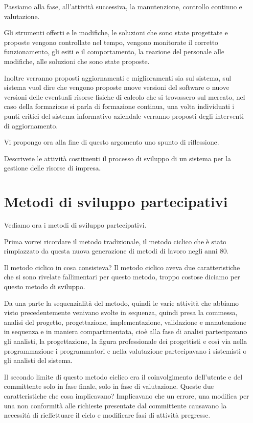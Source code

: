 Passiamo alla fase, all'attività successiva, la manutenzione, controllo continuo e valutazione.

Gli strumenti offerti e le modifiche, le soluzioni che sono state progettate e proposte vengono controllate nel tempo, vengono monitorate il corretto funzionamento, gli esiti e il comportamento, la reazione del personale alle modifiche, alle soluzioni che sono state proposte.

Inoltre verranno proposti aggiornamenti e miglioramenti sia sul sistema, sul sistema vuol dire che vengono proposte nuove versioni del software o nuove versioni delle eventuali risorse fisiche di calcolo che si trovassero sul mercato, nel caso della formazione si parla di formazione continua, una volta individuati i punti critici del sistema informativo aziendale verranno proposti degli interventi di aggiornamento.

Vi propongo ora alla fine di questo argomento uno spunto di riflessione.

Descrivete le attività costituenti il processo di sviluppo di un sistema per la gestione delle risorse di impresa.

\section{Metodi di sviluppo partecipativi}



Vediamo ora i metodi di sviluppo partecipativi.

Prima vorrei ricordare il metodo tradizionale, il metodo ciclico che è stato rimpiazzato da questa nuova generazione di metodi di lavoro negli anni 80.

Il metodo ciclico in cosa consisteva?
Il metodo ciclico aveva due caratteristiche che si sono rivelate fallimentari per questo metodo, troppo costose diciamo per questo metodo di sviluppo.

Da una parte la sequenzialità del metodo, quindi le varie attività che abbiamo visto precedentemente venivano svolte in sequenza, quindi presa la commessa, analisi del progetto, progettazione, implementazione, validazione e manutenzione in sequenza e in maniera compartimentata, cioè alla fase di analisi partecipavano gli analisti, la progettazione, la figura professionale dei progettisti e così via nella programmazione i programmatori e nella valutazione partecipavano i sistemisti o gli analisti del sistema.

Il secondo limite di questo metodo ciclico era il coinvolgimento dell'utente e del committente solo in fase finale, solo in fase di valutazione.
Queste due caratteristiche che cosa implicavano?
Implicavano che un errore, una modifica per una non conformità alle richieste presentate dal committente causavano la necessità di rieffettuare il ciclo e modificare fasi di attività pregresse.

